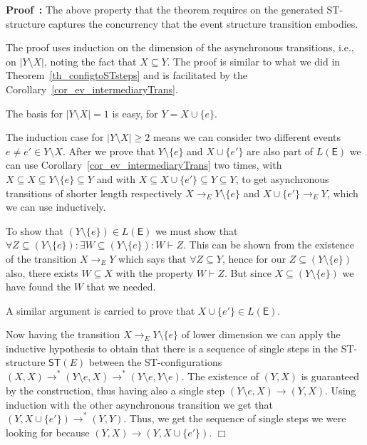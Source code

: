 \documentclass[submission,copyright,creativecommons]{eptcs}
\newenvironment{proof}[1][\!\!\,]{\vspace{1ex}\noindent\textbf{Proof #1: }}{\hfill$\Box$\vspace{2ex}}
\newcounter{case}
\newcommand\E{\ensuremath{\mathsf{E}}}
\newcommand\ST{\ensuremath{\mathsf{ST}}}
\newcommand\stepTransEvGlabbeek{\ensuremath{\rightarrow_{E}}}
\newcommand\enableRelEv{\ensuremath{\vdash}}
\newcommand\stEnc{\ensuremath{\ST}}
\newcommand{\transition}[1]{\ensuremath{\xrightarrow{#1}}}
\begin{document}
\begin{proof}
The above property that the theorem requires on the generated ST-structure captures the concurrency that the event structure transition embodies.


The proof uses induction on the dimension of the asynchronous transitions, i.e., on $|Y\setminus X|$, noting the fact that $X\subseteq Y$.
The proof is similar to what we did in Theorem~\ref{th_configtoSTsteps} and is facilitated by the Corollary~\ref{cor_ev_intermediaryTrans}.

The basis for $|Y\setminus X|=1$ is easy, for $Y=X\cup \{e\}$.

The induction case for $|Y\setminus X|\geq 2$ means we can consider two different events $e\neq e'\in Y\setminus X$. After we prove that $Y\setminus\{e\}$ and $X\cup\{e'\}$ are also part of $L(\E)$ we can use Corollary~\ref{cor_ev_intermediaryTrans} two times, with $X\subseteq X \subseteq Y\setminus\{e\}\subseteq Y$ and with $X\subseteq X\cup\{e'\} \subseteq Y\subseteq Y$, to get asynchronous transitions of shorter length respectively $X\stepTransEvGlabbeek Y\setminus\{e\}$ and $X\cup\{e'\}\stepTransEvGlabbeek Y$, which we can use inductively.

To show that $(Y\setminus\{e\})\in L(\E)$ we must show that $\forall Z\subseteq (Y\setminus\{e\}):\exists W\subseteq(Y\setminus\{e\}):W\enableRelEv Z$. 
This can be shown from the existence of the transition $X\stepTransEvGlabbeek Y$ which says that $\forall Z\subseteq Y$, hence for our $Z\subseteq (Y\setminus\{e\})$ also, there exists $W\subseteq X$ with the property $W\enableRelEv Z$. But since $X\subseteq (Y\setminus\{e\})$ we have found the $W$ that we needed.

A similar argument is carried to prove that $X\cup\{e'\}\in L(\E)$.

Now having the transition $X\stepTransEvGlabbeek Y\setminus\{e\}$ of lower dimension we can apply the inductive hypothesis to obtain that there is a sequence of single steps in the ST-structure $\stEnc(E)$ between the ST-configurations $(X,X)\transition{}^{*}(Y\setminus e,X)\transition{}^{*}(Y\setminus e,Y\setminus e)$. The existence of $(Y,X)$ is guaranteed by the construction, thus having also a single step $(Y\setminus e,X)\transition{}(Y,X)$. Using induction with the other asynchronous transition we get that $(Y,X\cup\{e'\})\transition{}^{*}(Y,Y)$. Thus, we get the sequence of single steps we were looking for because $(Y,X)\transition{}(Y,X\cup\{e'\})$.
\end{proof}
\end{document}
